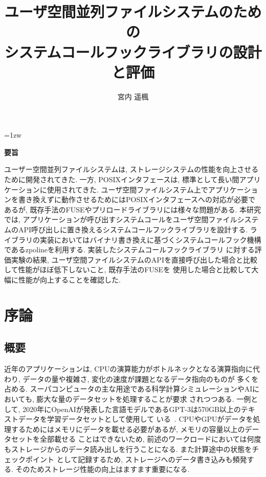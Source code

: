 \documentclass[a4paper,11pt]{jreport}
\title{ユーザ空間並列ファイルシステムのための\\システムコールフックライブラリの設計と評価}
\author{宮内 遥楓}
\begin{document}
\maketitle
\thispagestyle{empty}
\newpage

\thispagestyle{empty}
\vspace*{20pt plus 1fil}
\parindent=1zw
\noindent
\begin{center}
{\Large \bf 要旨}
\vspace{2cm}
\end{center}
ユーザー空間並列ファイルシステムは, ストレージシステムの性能を向上させるために開発されてきた. 
一方, POSIXインタフェースは, 標準として長い間アプリケーションに使用されてきた.
ユーザ空間ファイルシステム上でアプリケーションを書き換えずに動作させるためにはPOSIXインタフェースへの対応が必要であるが, 
既存手法のFUSEやプリロードライブラリには様々な問題がある.
本研究では, アプリケーションが呼び出すシステムコールをユーザ空間ファイルシステムのAPI呼び出しに置き換えるシステムコールフックライブラリを設計する.
ライブラリの実装においてはバイナリ書き換えに基づくシステムコールフック機構であるzpolineを利用する. 実装したシステムコールフックライブラリ
に対する評価実験の結果, ユーザ空間ファイルシステムのAPIを直接呼び出した場合と比較して性能がほぼ低下しないこと, 既存手法のFUSEを
使用した場合と比較して大幅に性能が向上することを確認した.

\par
\vspace{0pt plus 1fil}
\newpage

\tableofcontents
\listoffigures

\pagebreak \setcounter{page}{1}

\chapter{序論}
\section{概要}
近年のアプリケーションは, CPUの演算能力がボトルネックとなる演算指向に代わり, データの量や複雑さ, 変化の速度が課題となるデータ指向のものが
多くを占める. スーパコンピュータの主な用途である科学計算シミュレーションやAIにおいても, 膨大な量のデータセットを処理することが要求
されつつある. 一例として, 2020年にOpenAIが発表した言語モデルであるGPT-3は570GB以上のテキストデータを学習データセットとして使用して
いる~\cite{3495883}. CPUやGPUがデータを処理するためにはメモリにデータを載せる必要があるが, メモリの容量以上のデータセットを全部載せる
ことはできないため, 前述のワークロードにおいては何度もストレージからのデータ読み出しを行うことになる. また計算途中の状態をチェックポイント
として記録するため, ストレージへのデータ書き込みも頻発する. そのためストレージ性能の向上はますます重要になる. 
\end{document}
